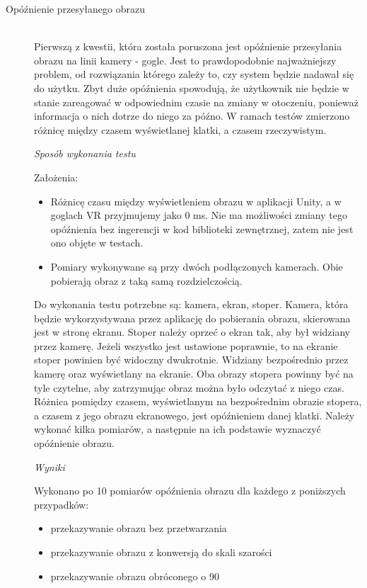 \documentclass[a4paper,11pt,twoside]{report}
\theoremstyle{definition}
\begin{document}
\begin{description}
\item[Opóźnienie przesyłanego obrazu] \hfill \\
Pierwszą z kwestii, która została poruszona jest opóźnienie przesyłania obrazu na linii kamery - gogle. Jest to prawdopodobnie najważniejszy problem, od rozwiązania którego zależy to, czy system będzie nadawał się do użytku. Zbyt duże opóźnienia spowodują, że użytkownik nie będzie w stanie zareagować w odpowiednim czasie na zmiany w otoczeniu, ponieważ informacja o nich dotrze do niego za późno. W ramach testów zmierzono różnicę między czasem wyświetlanej klatki, a czasem rzeczywistym.

\textit{Sposób wykonania testu}

Założenia:
\begin{itemize}
\item Różnicę czasu między wyświetleniem obrazu w aplikacji Unity, a w goglach VR przyjmujemy jako 0 ms. Nie ma możliwości zmiany tego opóźnienia bez ingerencji w kod biblioteki zewnętrznej, zatem nie jest ono objęte w testach.
\item Pomiary wykonywane są przy dwóch podłączonych kamerach. Obie pobierają obraz z taką samą rozdzielczością.
\end{itemize}

Do wykonania testu potrzebne są: kamera, ekran, stoper. Kamera, która będzie wykorzystywana przez aplikację do pobierania obrazu, skierowana jest w stronę ekranu. Stoper należy oprzeć o ekran tak, aby był widziany przez kamerę. Jeżeli wszystko jest ustawione poprawnie, to na ekranie stoper powinien być widoczny dwukrotnie. Widziany bezpośrednio przez kamerę oraz wyświetlany na ekranie. Oba obrazy stopera powinny być na tyle czytelne, aby zatrzymując obraz można było odczytać z niego czas.
Różnica pomiędzy czasem, wyświetlanym na bezpośrednim obrazie stopera, a czasem z jego obrazu ekranowego, jest opóźnieniem danej klatki.
Należy wykonać kilka pomiarów, a następnie na ich podstawie wyznaczyć opóźnienie obrazu.

\textit{Wyniki}

Wykonano po 10 pomiarów opóźnienia obrazu dla każdego z poniższych przypadków:
\begin{itemize}
\item przekazywanie obrazu bez przetwarzania
\item przekazywanie obrazu z konwersją do skali szarości
\item przekazywanie obrazu obróconego o 90\textdegree
\end{itemize}


\end{description}
\end{document}
